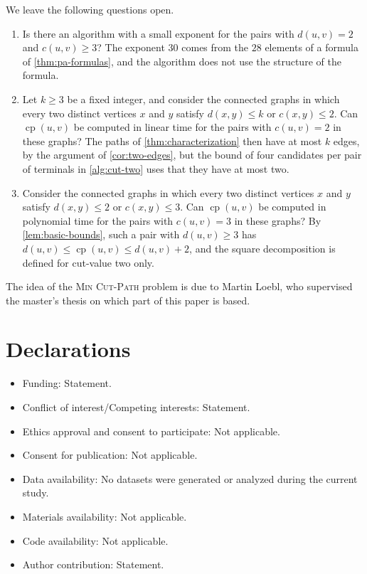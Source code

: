 \documentclass[pdflatex,sn-mathphys-num]{sn-jnl}%
\theoremstyle{thmstyleone}%
\theoremstyle{thmstyletwo}%
\theoremstyle{thmstylethree}%
\newcommand{\cp}{\operatorname{cp}}%
\newcommand{\MinCutPath}{\textsc{Min Cut-Path}}%
\begin{document}
We leave the following questions open.
\begin{enumerate}
\item Is there an algorithm with a small exponent for the pairs with $d(u, v) = 2$ and $c(u, v) \geq 3$?
The exponent $30$ comes from the $28$ elements of a formula of \cref{thm:pa-formulas}, and the algorithm does not use the structure of the formula.

\item Let $k \geq 3$ be a fixed integer, and consider the connected graphs in which every two distinct vertices $x$ and $y$ satisfy $d(x, y) \leq k$ or $c(x, y) \leq 2$.
Can $\cp(u, v)$ be computed in linear time for the pairs with $c(u, v) = 2$ in these graphs?
The paths of \cref{thm:characterization} then have at most $k$ edges, by the argument of \cref{cor:two-edges}, but the bound of four candidates per pair of terminals in \cref{alg:cut-two} uses that they have at most two.

\item Consider the connected graphs in which every two distinct vertices $x$ and $y$ satisfy $d(x, y) \leq 2$ or $c(x, y) \leq 3$.
Can $\cp(u, v)$ be computed in polynomial time for the pairs with $c(u, v) = 3$ in these graphs?
By \cref{lem:basic-bounds}, such a pair with $d(u, v) \geq 3$ has $d(u, v) \leq \cp(u, v) \leq d(u, v) + 2$, and the square decomposition is defined for cut-value two only.
\end{enumerate}

\backmatter


The idea of the \MinCutPath{} problem is due to Martin Loebl, who supervised the master's thesis on which part of this paper is based.

\section*{Declarations}

\begin{itemize}
\item Funding: Statement.
\item Conflict of interest/Competing interests: Statement.
\item Ethics approval and consent to participate: Not applicable.
\item Consent for publication: Not applicable.
\item Data availability: No datasets were generated or analyzed during the current study.
\item Materials availability: Not applicable.
\item Code availability: Not applicable.
\item Author contribution: Statement.
\end{itemize}
\end{document}
